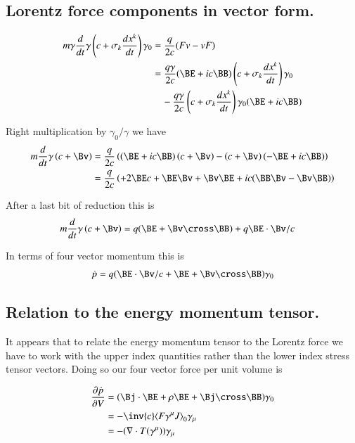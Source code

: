 \subsection{Lorentz force components in vector form. }

\begin{align*}
m \gamma \frac{d}{dt} \gamma \left(c + \sigma_k \frac{dx^k}{dt}\right) \gamma_0
&= \frac{q}{2c}(F v - v F) \\
&=
\frac{q \gamma}{2c} 
(\BE + i c\BB) 
\left(c + \sigma_k \frac{dx^k}{dt}\right) \gamma_0
\\
&\quad -
\frac{q \gamma}{2c} 
\left(c + \sigma_k \frac{dx^k}{dt}\right) \gamma_0
(\BE + i c\BB) \\
\end{align*}

Right multiplication by $\gamma_0/\gamma$ we have
\begin{align*}
m \frac{d}{dt} \gamma \left(c + \Bv \right) 
&= \frac{q }{2c} \left( (\BE + i c\BB) \left(c + \Bv \right) -\left(c + \Bv \right) (-\BE + i c\BB) \right) \\
&= \frac{q }{2c} \left( 
+ 2 \BE c 
+ \BE \Bv  + \Bv \BE 
+ i c (\BB \Bv  - \Bv \BB)
\right) \\
\end{align*}

After a last bit of reduction this is
\begin{align}
m \frac{d}{dt} \gamma \left(c + \Bv \right) &= q (\BE + \Bv \cross \BB) + q \BE \cdot \Bv/c
\end{align}

In terms of four vector momentum this is
\begin{align}\label{eqn:seLorentz:lorentzForceVec}
\dot{p} = q ( \BE \cdot \Bv/c + \BE + \Bv \cross \BB ) \gamma_0
\end{align}

\subsection{Relation to the energy momentum tensor. }

It appears that to relate the energy momentum tensor to the Lorentz force we have 
to work with the upper index quantities rather than the lower index stress tensor vectors.  Doing so
our four vector force per unit volume is
 
\begin{align}
\PD{V}{\dot{p}}
&= (\Bj \cdot \BE + \rho \BE + \Bj \cross \BB) \gamma_0 \\
&= - \inv{c} \gpgradezero{ F \gamma^\mu J } \gamma_\mu \\
&= - (\grad \cdot T(\gamma^\mu)) \gamma_\mu
\end{align}


